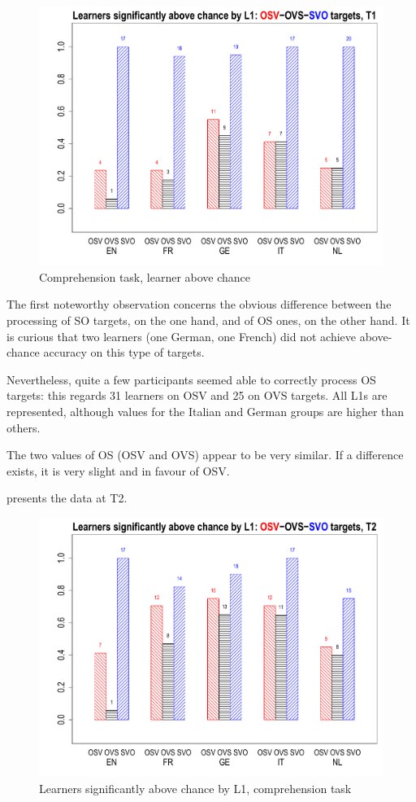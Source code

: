 \begin{figure}
    \includegraphics[width=\textwidth]{figures/05-5.pdf}
    \caption{Comprehension task, learner above chance}
    \label{fig:05:5}
\end{figure}

The first noteworthy observation concerns the obvious difference between the processing of SO targets, on the one hand, and of OS ones, on the other hand. It is curious that two learners (one German, one French) did not achieve above-chance accuracy on this type of targets. 

Nevertheless, quite a few participants seemed able to correctly process OS targets: this regards 31 learners on OSV and 25 on OVS targets. All L1s are represented, although values for the Italian and German groups are higher than others. 

The two values of OS (OSV and OVS) appear to be very similar. If a difference exists, it is very slight and in favour of OSV. 

 presents the data at T2.

\begin{figure}
    \includegraphics[width=\textwidth]{figures/05-6.pdf}
    \caption{Learners significantly above chance by L1, comprehension task}
    \label{fig:05:6}
\end{figure}

